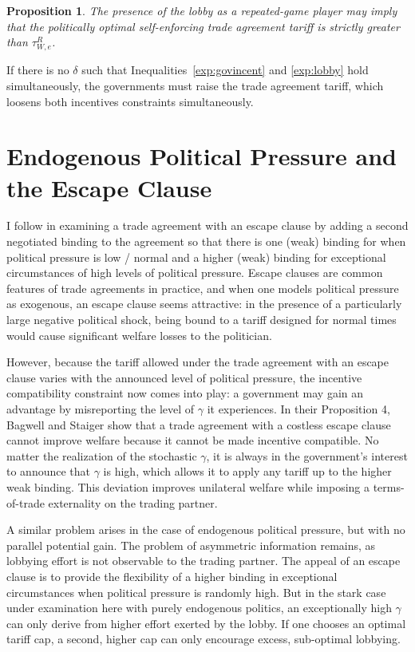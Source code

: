 \documentclass[12pt]{article}
\newtheorem{proposition}{Proposition}
\newcommand{\ga}{\gamma}
\newcommand{\de}{\delta}
\begin{document}
\begin{proposition}
  The presence of the lobby as a repeated-game player may imply that the politically optimal self-enforcing trade agreement tariff is strictly greater than $\tau^R_{W,e}$. 
\end{proposition}

If there is no $\de$ such that Inequalities~\ref{exp:govincent} and \ref{exp:lobby} hold simultaneously, the governments must raise the trade agreement tariff, which loosens both incentives constraints simultaneously.

\section{Endogenous Political Pressure and the Escape Clause}
\label{sec:escape}
I follow \Textcite{bs2005} in examining a trade agreement with an escape clause by adding a second negotiated binding to the agreement so that there is one (weak) binding for when political pressure is low / normal and a higher (weak) binding for exceptional circumstances of high levels of political pressure. Escape clauses are common features of trade agreements in practice, and when one models political pressure as exogenous, an escape clause seems attractive: in the presence of a particularly large negative political shock, being bound to a tariff designed for normal times would cause significant welfare losses to the politician.

However, because the tariff allowed under the trade agreement with an escape clause varies with the announced level of political pressure, the incentive compatibility constraint now comes into play: a government may gain an advantage by misreporting the level of $\ga$ it experiences. In their Proposition 4, Bagwell and Staiger show that a trade agreement with a costless escape clause cannot improve welfare because it cannot be made incentive compatible. No matter the realization of the stochastic $\ga$, it is always in the government's interest to announce that $\ga$ is high, which allows it to apply any tariff up to the higher weak binding. This deviation improves unilateral welfare while imposing a terms-of-trade externality on the trading partner.

A similar problem arises in the case of endogenous political pressure, but with no parallel potential gain. The problem of asymmetric information remains, as lobbying effort is not observable to the trading partner. The appeal of an escape clause is to provide the flexibility of a higher binding in exceptional circumstances when political pressure is randomly high. But in the stark case under examination here with purely endogenous politics, an exceptionally high $\ga$ can only derive from higher effort exerted by the lobby. If one chooses an optimal tariff cap, a second, higher cap can only encourage excess, sub-optimal lobbying.
\end{document}
